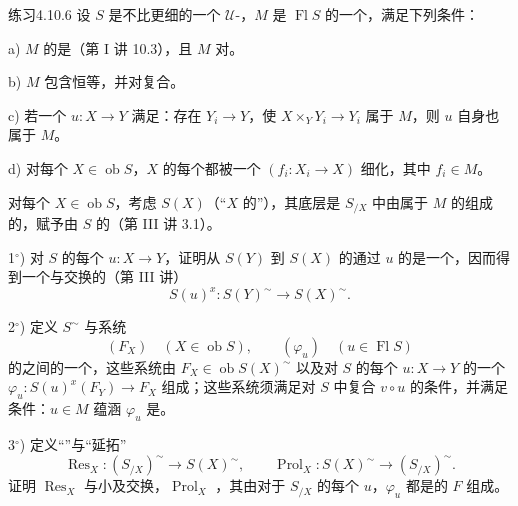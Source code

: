 \begin{SGAresult}{练习}{4.10.6}
设 $S$ 是不比更细的一个 $\mathcal U$-，$M$ 是 $\operatorname{Fl}S$ 的一个，满足下列条件：

 a) $M$ 的是（第 I 讲 10.3），且 $M$ 对。

 b) $M$ 包含恒等，并对复合。

 c) 若一个 $u:X\to Y$ 满足：存在 $Y_i\to Y$，使 $X\times_Y Y_i\to Y_i$ 属于 $M$，则 $u$ 自身也属于 $M$。

 d) 对每个 $X\in\operatorname{ob}S$，$X$ 的每个都被一个 $(f_i:X_i\to X)$ 细化，其中 $f_i\in M$。

对每个 $X\in\operatorname{ob}S$，考虑 $S(X)$（“$X$ 的”），其底层是 $S_{/X}$ 中由属于 $M$ 的组成的，赋予由 $S$ 的（第 III 讲 3.1）。

 1$^\circ$) 对 $S$ 的每个 $u:X\to Y$，证明从 $S(Y)$ 到 $S(X)$ 的通过 $u$ 的是一个，因而得到一个与交换的（第 III 讲）
\[
 S(u)^x:S(Y)^\sim\longrightarrow S(X)^\sim.
\]

 2$^\circ$) 定义 $S^\sim$ 与系统
\[
 (F_X)\quad(X\in\operatorname{ob}S),\qquad(\varphi_u)\quad(u\in\operatorname{Fl}S)
\]
的之间的一个，这些系统由 $F_X\in\operatorname{ob}S(X)^\sim$ 以及对 $S$ 的每个 $u:X\to Y$ 的一个 $\varphi_u:S(u)^x(F_Y)\to F_X$ 组成；这些系统须满足对 $S$ 中复合 $v\circ u$ 的条件，并满足条件：$u\in M$ 蕴涵 $\varphi_u$ 是。

 3$^\circ$) 定义“”与“延拓”
\[
 \operatorname{Res}_X:(S_{/X})^\sim\longrightarrow S(X)^\sim,\qquad
 \operatorname{Prol}_X:S(X)^\sim\longrightarrow(S_{/X})^\sim.
\]
证明 $\operatorname{Res}_X$ 与小及交换，$\operatorname{Prol}_X$ ，其由对于 $S_{/X}$ 的每个 $u$，$\varphi_u$ 都是的 $F$ 组成。


\end{SGAresult}

